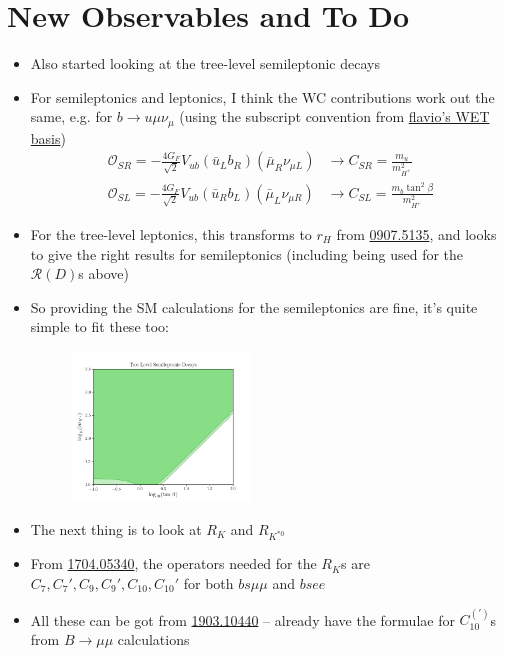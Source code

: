 \documentclass[11pt]{article}
\begin{document}
\section{New Observables and To Do}
\begin{itemize}
    \item Also started looking at the tree-level semileptonic decays 
    \item For semileptonics and leptonics, I think the WC contributions work out the same, e.g. for $b\to u\mu\nu_\mu$ (using the subscript convention from \href{https://wcxf.github.io/assets/pdf/WET.flavio.pdf}{flavio's WET basis})
        \begin{align*}
            \mathcal{O}_{SR} = -\frac{4G_F}{\sqrt{2}}V_{ub}(\bar{u}_Lb_R)(\bar{\mu}_R\nu_{\mu L}) &\to C_{SR} = \frac{m_u}{m_{H^+}^2} \\
            \mathcal{O}_{SL} = -\frac{4G_F}{\sqrt{2}}V_{ub}(\bar{u}_Rb_L)(\bar{\mu}_L\nu_{\mu R}) &\to C_{SL} = \frac{m_b\tan^2\beta}{m_{H^+}^2} 
        \end{align*}
    \item For the tree-level leptonics, this transforms to $r_H$ from \href{https://arxiv.org/pdf/0907.5135.pdf}{0907.5135}, and looks to give the right results for semileptonics (including being used for the $\mathcal{R}(D)$s above) 
    \item So providing the SM calculations for the semileptonics are fine, it's quite simple to fit these too:
        \begin{figure}[H]
            \centering
            \includegraphics[width=0.45\textwidth]{sls_plot.png}
        \end{figure}
    \item The next thing is to look at $R_K$ and $R_{K^{*0}}$ 
    \item From \href{https://arxiv.org/pdf/1704.05340.pdf}{1704.05340}, the operators needed for the $R_K$s are $C_7,C_7',C_9,C_9',C_{10},C_{10}'$ for both $bs\mu\mu$ and $bsee$
    \item All these can be got from \href{https://arxiv.org/pdf/1903.10440.pdf}{1903.10440} -- already have the formulae for $C_{10}^{(')}$s from $B\to\mu\mu$ calculations

\end{itemize}
\end{document}
